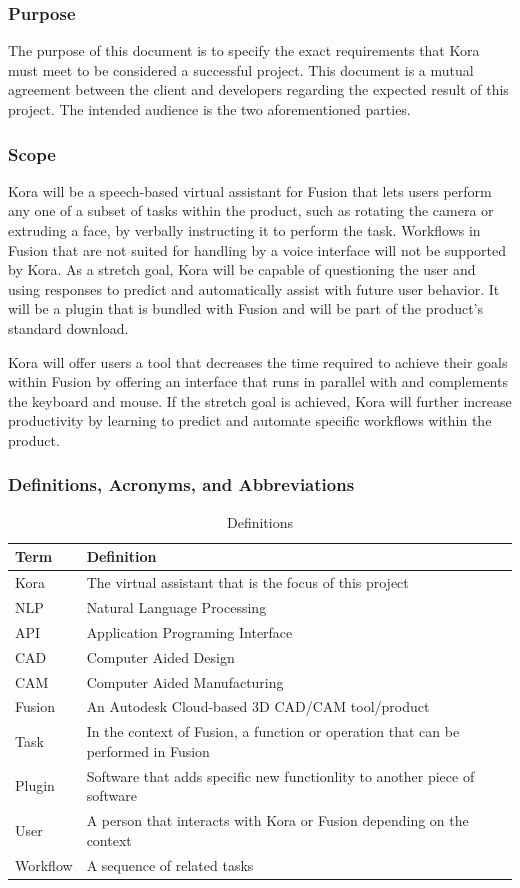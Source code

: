 \documentclass[onecolumn, draftclsnofoot,10pt, compsoc]{IEEEtran}
\def \botname{Kora\xspace}
\begin{document}
	\subsubsection{Purpose}
	The purpose of this document is to specify the exact requirements that \botname must meet to be considered a successful project.
	This document is a mutual agreement between the client and developers regarding the expected result of this project.
	The intended audience is the two aforementioned parties.
	\subsubsection{Scope}
	\botname will be a speech-based virtual assistant for Fusion that lets users perform any one of a subset of tasks within the product, such as rotating the camera or extruding a face, by verbally instructing it to perform the task.
	Workflows in Fusion that are not suited for handling by a voice interface will not be supported by \botname.
	As a stretch goal, \botname will be capable of questioning the user and using responses to predict and automatically assist with future user behavior.
	It will be a plugin that is bundled with Fusion and will be part of the product's standard download.

	\botname will offer users a tool that decreases the time required to achieve their goals within Fusion by offering an interface that runs in parallel with and complements the keyboard and mouse.
	If the stretch goal is achieved, \botname will further increase productivity by learning to predict and automate specific workflows within the product.


	\subsubsection{Definitions, Acronyms, and Abbreviations}
	\begin{table}[h]
		\centering
		\caption{Definitions}
		\label{my-label}
		\begin{tabular}{|l|l|}
			\hline
			\textbf{Term} & \textbf{Definition} \\ \hline
			\botname & The virtual assistant that is the focus of this project \\ \hline
			NLP & Natural Language Processing \\ \hline
			API & Application Programing Interface \\ \hline
			CAD & Computer Aided Design \\ \hline
			CAM & Computer Aided Manufacturing \\ \hline
			Fusion & An Autodesk Cloud-based 3D CAD/CAM tool/product \\ \hline
			Task & In the context of Fusion, a function or operation that can be performed in Fusion \\ \hline
			Plugin & Software that adds specific new functionlity to another piece of software \\ \hline
			User & A person that interacts with \botname or Fusion depending on the context \\ \hline
			Workflow & A sequence of related tasks \\ \hline
		\end{tabular}
	\end{table}
\end{document}
